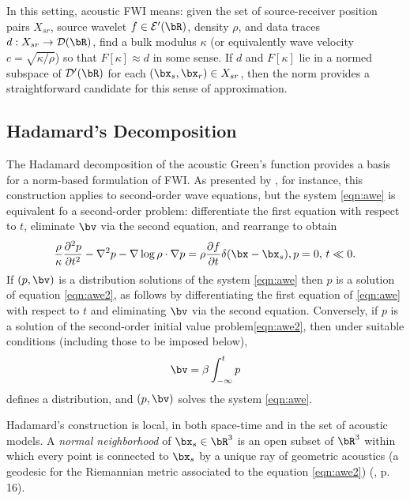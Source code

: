 In this setting, acoustic FWI means: given the set of
source-receiver position pairs $X_{sr}$, source wavelet
$f \in {\cal E}'(\bR)$,  density $\rho$, and data traces
$d:  X_{sr} \rightarrow \cal{D}(\bR)$, find a bulk modulus $\kappa$
(or equivalently wave velocity $c=\sqrt{\kappa/\rho}$)
so that $F[\kappa] \approx d$ in some sense. If
$d$ and $F[\kappa]$ lie in a normed subspace of ${\cal D}'(\bR)$ for each
$(\bx_s,\bx_r) \in X_{sr}$, then the
norm provides a straightforward candidate for this sense of
approximation.


\subsection{Hadamard's Decomposition}
The Hadamard decomposition of the acoustic Green's function \cite[]{Friedlander:75,Qian:JCP24} provides a
basis for a norm-based formulation of FWI. As presented by
\cite{Friedlander:75}, for instance, this construction applies to
second-order wave equations, but the system \ref{eqn:awe} is
equivalent fo a second-order problem: differentiate the first equation
with respect to $t$, eliminate $\bv$ via the second equation, and
rearrange to obtain
\begin{equation}
  \label{eqn:awe2}
  \frac{\rho}{\kappa}\frac{\partial^2 p}{\partial t^2} - \nabla^2 p -
  \nabla \log \rho \cdot \nabla p = \rho \frac{\partial f}{\partial t}
  \delta(\bx-\bx_s), \nonumber \\
  p=0, \, t \ll 0.
\end{equation}
If $(p,\bv)$ is a distribution solutions of the system
\ref{eqn:awe} then $p$ is a solution of equation
\ref{eqn:awe2}, as follows by differentiating the first equation of
\ref{eqn:awe} with respect to $t$ and eliminating $\bv$ via the second
equation. Conversely, if $p$ is a solution of the second-order initial
value problem\ref{eqn:awe2}, then under suitable conditions (including
those to be imposed below),
\[
  \bv = \beta \int_{-\infty}^t p
\]
defines a distribution, and $(p,\bv)$ solves the system \ref{eqn:awe}.

Hadamard's construction is local, in both space-time and in the set of
acoustic models. A {\em normal neighborhood} of
$\bx_s \in \bR^3$ is an open subset of $\bR^3$ 
within which every point is connected to $\bx_s$ by  a unique ray of
geometric acoustics (a geodesic for the Riemannian metric associated
to the equation \ref{eqn:awe2}) (\cite{Friedlander:75},
p. 16).

